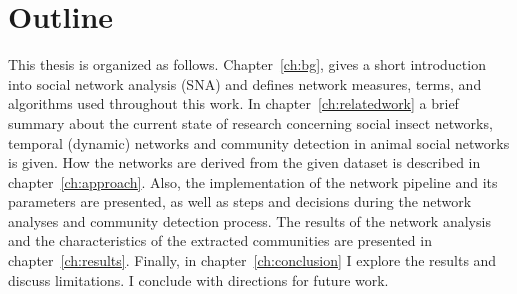 \section{Outline}
This thesis is organized as follows.
Chapter~\ref{ch:bg}, gives a short introduction into social network analysis (SNA) and defines network measures, terms, and algorithms used throughout this work.
In chapter~\ref{ch:relatedwork} a brief summary about the current state of research concerning social insect networks, temporal (dynamic) networks and community detection in animal social networks is given. 
How the networks are derived from the given dataset is described in chapter~\ref{ch:approach}.
Also, the implementation of the network pipeline and its parameters are presented, as well as steps and decisions during the network analyses and community detection process.
The results of the network analysis and the characteristics of the extracted communities are presented in chapter~\ref{ch:results}.
Finally, in chapter~\ref{ch:conclusion} I explore the results and discuss limitations.
I conclude with directions for future work.